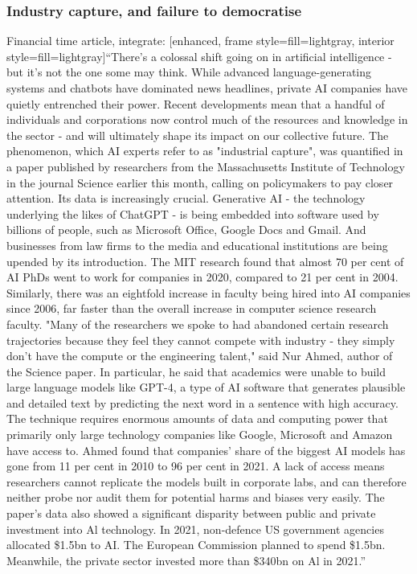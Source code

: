 \subsubsection{Industry capture, and failure to democratise}
Financial time article, integrate:
[enhanced, frame style={fill=lightgray}, interior style={fill=lightgray}]``There's a colossal shift going on in artificial intelligence - but it's not the one some may think. While advanced language-generating systems and chatbots have dominated news headlines, private AI companies have quietly entrenched their power. Recent developments mean that a handful of individuals and corporations now control much of the resources and knowledge in the sector - and will ultimately shape its impact on our collective future. The phenomenon, which AI experts refer to as "industrial capture", was quantified in a paper published by researchers from the Massachusetts Institute of Technology in the journal Science earlier this month, calling on policymakers to pay closer attention. Its data is increasingly crucial. Generative AI - the technology underlying the likes of ChatGPT - is being embedded into software used by billions of people, such as Microsoft Office, Google Docs and Gmail. And businesses from law firms to the media and educational institutions are being upended by its introduction.
The MIT research found that almost 70 per cent of AI PhDs went to work for companies in 2020, compared to 21 per cent in 2004. Similarly, there was an eightfold increase in faculty being hired into AI companies since 2006, far faster than the overall increase in computer science research faculty. "Many of the researchers we spoke to had abandoned certain research trajectories because they feel they cannot compete with industry - they simply don't have the compute or the engineering talent," said Nur Ahmed, author of the Science paper. In particular, he said that academics were unable to build large language models like GPT-4, a type of AI software that generates plausible and detailed text by predicting the next word in a sentence with high accuracy. The technique requires enormous amounts of data and computing power that primarily only large technology companies like Google, Microsoft and Amazon have access to. Ahmed found that companies' share of the biggest AI models has gone from 11 per cent in 2010 to 96 per cent in 2021. A lack of access means researchers cannot replicate the models built in corporate labs, and can therefore neither probe nor audit them for potential harms and biases very easily. The paper's data also showed a significant disparity between public and private investment into Al technology. In 2021, non-defence US government agencies allocated \$1.5bn to AI. The European Commission planned to spend \$1.5bn. Meanwhile, the private sector invested more than \$340bn on Al in 2021.''
